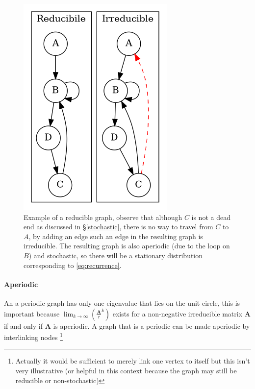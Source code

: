 \documentclass[11pt]{article}
\begin{document}
{
\begin{figure}
    \includegraphics[width=\0.28\textwidth]{media/dot/reducible_graph_example.dot.png}

    \caption{\label{irreducible-example}Example of a reducible graph, observe that although \(C\) is not a dead end as discussed in \S \ref{stochastic}, there is no way to travel from \(C\) to \(A\), by adding an edge such an edge in the resulting graph is irreducible. The resulting graph is also aperiodic (due to the loop on \(B\)) and stochastic, so there will be a stationary distribution corresponding to \eqref{eq:recurrence}.}
\end{figure}
}

\paragraph{Aperiodic}
\label{sec:org2c6170b}
An a periodic graph has only one eigenvalue that lies on the unit circle, this is important because \(\lim_{k\rightarrow \infty} \left( \frac{\mathbf{A}}{r}^{k} \right)\) exists for a non-negative irreducible matrix \(\mathbf{A}\) if and only if \(\mathbf{A}\) is aperiodic. A graph that is a periodic can be made aperiodic by interlinking nodes \footnote{Actually it would be sufficient to merely link one vertex to itself \cite[]{langvilleGooglePageRankScience2012} but this isn't very illustrative (or helpful in this context because the graph may still be reducible or non-stochastic)}
\end{document}

